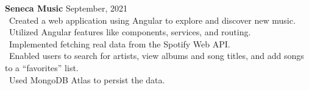 {\textbf{Seneca Music} \hfill {September, 2021} \\
\hspace*{4pt} \textbullet~{Created a web application using Angular to explore and discover new music.} \\
\hspace*{4pt} \textbullet~{Utilized Angular features like components, services, and routing.} \\
\hspace*{4pt} \textbullet~{Implemented fetching real data from the Spotify Web API.} \\
\hspace*{4pt} \textbullet~{Enabled users to search for artists, view albums and song titles, and add songs to a “favorites” list.} \\
\hspace*{4pt} \textbullet~{Used MongoDB Atlas to persist the data.}} \\